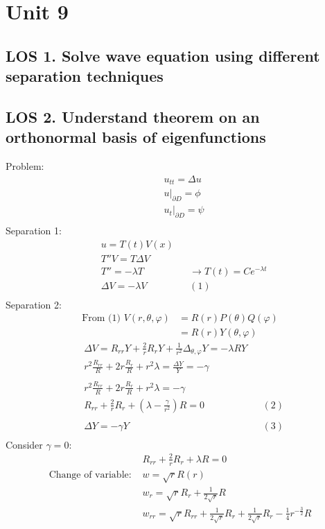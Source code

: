 \documentclass[12pt, a4paper]{article}
\begin{document}
\section*{Unit 9}
\vspace{1em}

\subsection*{LOS 1. Solve wave equation using different separation techniques}
\subsection*{LOS 2. Understand theorem on an orthonormal basis of eigenfunctions}
Problem:
\begin{align*}
    &u_{tt} = \Delta u\\
    &\left.u\right\rvert_{\partial D} = \phi\\
    &\left.u_t\right\rvert_{\partial D} = \psi\\
\end{align*}
Separation 1:
\begin{align*}
    &u = T(t)V(x)\\
    &T''V = T\Delta V\\
    &T'' = -\lambda T &&\rightarrow T(t) = Ce^{-\lambda t}\\
    &\Delta V = -\lambda V &&(1)\\
\end{align*}
Separation 2:
\begin{align*}
    \text{From (1) } V(r, \theta, \varphi) &= R(r)P(\theta)Q(\varphi)\\
    &= R(r)Y(\theta, \varphi)
\end{align*}
\begin{align*}
    &\Delta V = R_{rr}Y + \frac{2}{r}R_rY + \frac{1}{r^2}\Delta_{\theta, \varphi}Y = -\lambda RY\\
    &r^2\frac{R_{rr}}{R} + 2r\frac{R_r}{R} + r^2\lambda = \frac{\Delta Y}{Y} = -\gamma\\\\
    &r^2\frac{R_{rr}}{R} + 2r\frac{R_r}{R} + r^2\lambda= -\gamma\\
    &R_{rr} + \frac{2}{r}R_r + \left(\lambda - \frac{\gamma}{r^2}\right)R= 0&&(2)\\\\
    &\Delta Y = -\gamma Y &&(3)\\
\end{align*}
Consider $\gamma =0$:
\begin{align*}
    &R_{rr} + \frac{2}{r}R_r + \lambda R= 0\\
    \text{Change of variable: }&w = \sqrt{r}R(r)\\
    &w_r = \sqrt{r}R_r + \frac{1}{2\sqrt{r}}R\\
    &w_{rr} = \sqrt{r}R_{rr} + \frac{1}{2\sqrt{r}}R_r+ \frac{1}{2\sqrt{r}}R_r-\frac{1}{4}r^{-\frac{3}{2}}R\\
\end{align*}
\end{document}
